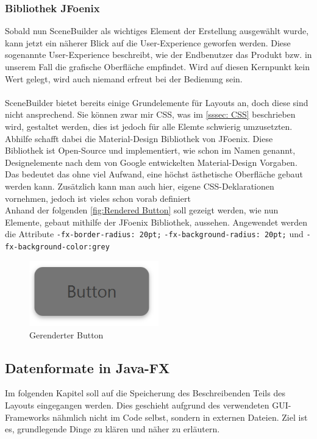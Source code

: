 \subsubsection{Bibliothek JFoenix}
Sobald nun SceneBuilder als wichtiges Element der Erstellung ausgewählt wurde, kann jetzt ein näherer Blick auf die User-Experience geworfen werden.
Diese sogenannte User-Experience beschreibt, wie der Endbenutzer das Produkt bzw. in unserem Fall die grafische Oberfläche empfindet.
Wird auf diesen Kernpunkt kein Wert gelegt, wird auch niemand erfreut bei der Bedienung sein.\\\\
SceneBuilder bietet bereits einige Grundelemente für Layouts an, doch diese sind nicht ansprechend.
Sie können zwar mir CSS, was im \autoref{sssec: CSS} beschrieben wird, gestaltet werden, dies ist jedoch für alle Elemte schwierig umzusetzten.
Abhilfe schafft dabei die Material-Design Bibliothek von JFoenix.
Diese Bibliothek ist Open-Source und implementiert, wie schon im Namen genannt, Designelemente nach dem von Google entwickelten Material-Design Vorgaben.
Das bedeutet das ohne viel Aufwand, eine höchst ästhetische Oberfläche gebaut werden kann.
Zusätzlich kann man auch hier, eigene CSS-Deklarationen vornehmen, jedoch ist vieles schon vorab definiert\\
Anhand der folgenden \autoref{fig:Rendered Button} soll gezeigt werden, wie nun Elemente, gebaut mithilfe der JFoenix Bibliothek, aussehen.
Angewendet werden die Attribute \lstinline{-fx-border-radius: 20pt;}  \lstinline{-fx-background-radius: 20pt;} und \lstinline{-fx-background-color:grey}
\begin{figure}[htb!]
    \centering
    \includegraphics[width=0.5\textwidth]{fig/ainf/RenderedButton.PNG}
    \caption{Gerenderter Button}
    \label{fig:Rendered Button}
\end{figure}
\subsection{Datenformate in Java-FX}\label{subsec:datenformate-in-java-fx}
Im folgenden Kapitel soll auf die Speicherung des Beschreibenden Teils des Layouts eingegangen werden.
Dies geschieht aufgrund des verwendeten GUI-Frameworks nähmlich nicht im Code selbst, sondern in externen Dateien.
Ziel ist es, grundlegende Dinge zu klären und näher zu erläutern.
